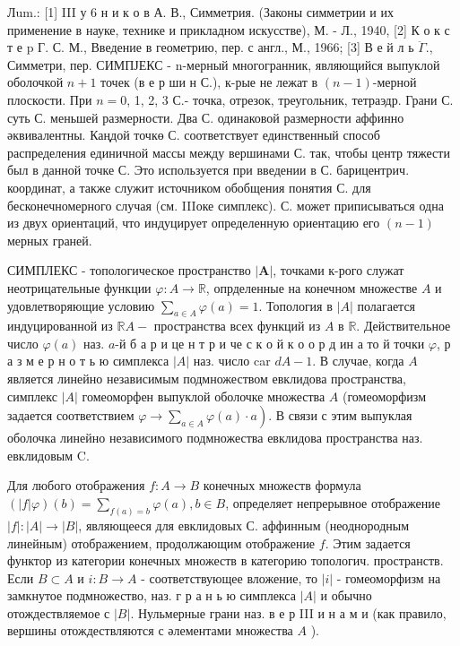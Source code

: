 \documentclass[10pt]{article}
\begin{document}
Лum.: [1] III у 6 н и к о в А. В., Симметрия. (Законы симметрии и их применение в науке, технике и прикладном искусстве), М. - Л., 1940, [2] К о к с т е p Г. С. М., Введение в геометрию, пер. с англ., М., 1966; [3] В е й л ь $\ddot{\Gamma} .$, Симметри, пер. СИМПЈЕКС - n-мерный многогранник, являющийся выпуклой оболочкой $n+1$ точек (в е р ши н С.), к-рые не лежат в $(n-1)$-мерной плоскости. При $n=0$, 1, 2, 3 С.- точка, отрезок, треугольник, тетраэдр. Грани С. суть С. меньшей размерности. Два С. одинаковой размерности аффинно әквивалентны. Каңдой точкө С. соответствует единственный способ распределения единичной массы между вершинами С. так, чтобы центр тяжести был в данной точке С. Это используется при введении в С. барицентрич. координат, а также служит источником обобщения понятия С. для бесконечномерного случая (см. IIIоке симплекс). С. может приписываться одна из двух ориентаций, что индуцирует определенную ориентацию его $(n-1)$ мерных граней.



СИМПЛЕКС - топологическое пространство $|\boldsymbol{A}|$, точками к-рого служат неотрицательные функции $\varphi: A \rightarrow \mathbb{R}$, опрделенные на конечном множестве $A$ и удовлетворяющие условию $\sum_{a \in A} \varphi(a)=1$. Топология в $|A|$ полагается индуцированной из $\mathbb{R} A-$ пространства всех функций из $A$ в $\mathbb{R}$. Действительное число $\varphi(a)$ наз. $a$-й б а р и це н т р и че с к о й к о о р д ин а то й точки $\varphi$, р а з м е р н о т ь ю симплекса $|A|$ наз. число car $d A-1$. В случае, когда $A$ является линейно независимым подмножеством евклидова пространства, симплекс $|A|$ гомеоморфен выпуклой оболочке множества $A$ (гомеоморфизм задается соответствием $\left.\varphi \rightarrow \sum_{a \in A} \varphi(a) \cdot a\right)$. В связи с этим выпуклая оболочка линейно независимого подмножества евклидова пространства наз. евклидовым $\mathrm{C}$.



Для любого отображения $f: A \rightarrow B$ конечных множеств формула $(|f| \varphi)(b)=\sum_{f(a)=b} \varphi(a), b \in B$, определяет непрерывное отображение $|f|:|A| \rightarrow|B|$, являющееся для евклидовых С. аффинным (неоднородным линейным) отображением, продолжающим отображение $f$. Этим задается функтор из категории конечных множеств в категорию топологич. пространств. Если $B \subset A$ и $i: B \rightarrow A$ - соответствующее вложение, то $|i|$ - гомеоморфизм на замкнутое подмножество, наз. г р а н ь ю симплекса $|A|$ и обычно отождествляемое с $|B|$. Нульмерные грани наз. в е р III и н а м и (как правило, вершины отождествляются с әлементами множества $A$ ).
\end{document}
